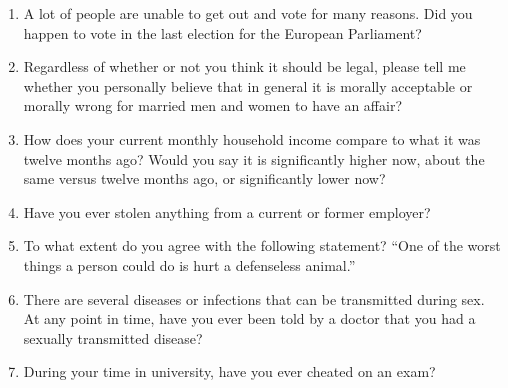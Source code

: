 \documentclass[a4, 12pt]{article}
\begin{document}
\begin{enumerate}
	\item A lot of people are unable to get out and vote for many reasons. Did you happen to vote in the last election for the European Parliament?
	
	\item Regardless of whether or not you think it should be legal, please tell me whether you personally believe that in general it is morally acceptable or morally wrong for married men and women to have an affair?
		
	\item How does your current monthly household income compare to what it was twelve months ago? Would you say it is significantly higher now, about the same versus twelve months ago, or significantly lower now?
	
	\item Have you ever stolen anything from a current or former employer?
	
	\item To what extent do you agree with the following statement? ``One of the worst things a person could do is hurt a defenseless animal.''

	\item There are several diseases or infections that can be transmitted during sex. At any point in time, have you ever been told by a doctor that you had a sexually transmitted disease?
	
	\item During your time in university, have you ever cheated on an exam?

\end{enumerate}
\end{document}
